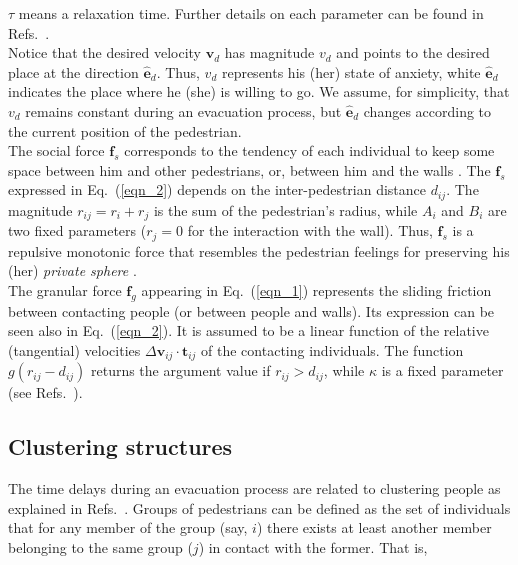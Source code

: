 $\tau$ means a relaxation time. Further details on each parameter can be found 
in Refs.~\cite{Helbing1,Dorso1,Dorso2,Dorso3,Dorso4}.\\

Notice that the desired velocity $\mathbf{v}_d$ has magnitude $v_d$ and points 
to the desired place at the direction $\hat{\mathbf{e}}_d$. Thus, $v_d$ 
represents his (her) state of anxiety, white $\hat{\mathbf{e}}_d$ indicates the 
place where he (she) is willing to go. We assume, for simplicity, that 
$v_d$ remains constant during an evacuation process, but $\hat{\mathbf{e}}_d$ 
changes according to the current position of the pedestrian.   \\

The social force $\mathbf{f}_s$ corresponds to the tendency of each individual 
to keep some space between him and other pedestrians, or, between him and the 
walls \cite{Helbing4}. The $\mathbf{f}_s$ expressed in Eq.~(\ref{eqn_2}) 
depends on the inter-pedestrian distance $d_{ij}$. The magnitude 
$r_{ij}=r_i+r_j$ is the sum of the pedestrian's radius, while $A_i$ and $B_i$ 
are two fixed parameters ($r_j=0$ for the interaction with the wall). Thus, 
$\mathbf{f}_s$ is a repulsive monotonic force that resembles the pedestrian 
feelings for preserving his (her) \textit{private sphere} 
\cite{Helbing1,Helbing4}. \\

The granular force $\mathbf{f}_g$ appearing in Eq.~(\ref{eqn_1}) represents the 
sliding friction between contacting people (or between people  and walls). Its 
expression can be seen also in Eq.~(\ref{eqn_2}). It is assumed to be a linear 
function of the relative (tangential) velocities $\Delta
\mathbf{v}_{ij}\cdot\mathbf{t}_{ij}$ of the contacting individuals. The 
function $g(r_{ij}-d_{ij})$ returns the argument value if $r_{ij}>d_{ij}$, 
while $\kappa$ is a fixed parameter (see 
Refs.~\cite{Helbing1,Dorso1,Dorso2,Dorso3,Dorso4}).\\ 


\subsection{\label{human}Clustering structures}

The time delays during an evacuation process are related to clustering people 
as explained in Refs.~\cite{Dorso1,Dorso2}. Groups of pedestrians can 
be defined as the set of individuals that for any member of the group (say, 
$i$) there exists at least another member belonging to the same group ($j$) 
in contact with the former. That is, 

